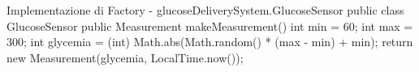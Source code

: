 \begin{javaCode}{Implementazione di Factory - glucoseDeliverySystem.GlucoseSensor}
public class GlucoseSensor {
    public Measurement makeMeasurement() {
        int min = 60;
        int max = 300;
        int glycemia = (int) Math.abs(Math.random() * (max - min) + min);
        return new Measurement(glycemia, LocalTime.now());
    }
}
\end{javaCode}
